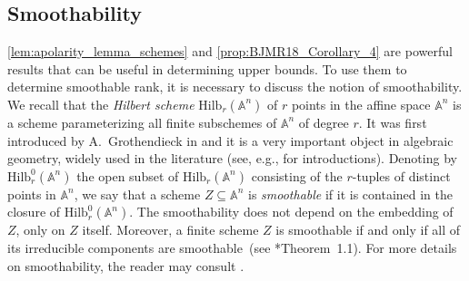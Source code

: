 \documentclass[a4paper,11pt,reqno]{amsart}
\newcommand{\bbA}{\mathbb{A}}
\newcommand{\bbK}{\mathbb{K}}
\newcommand{\Hilb}{\mathrm{Hilb}}
\numberwithin{equation}{section}
\theoremstyle{definition}
\theoremstyle{plain}
\theoremstyle{remark}
\begin{document}
\subsection{Smoothability}\label{sec:smoothability}
\noindent \autoref{lem:apolarity_lemma_schemes} and \autoref{prop:BJMR18_Corollary_4}
are powerful results that can be useful in determining upper bounds. To use them to determine smoothable rank, it is necessary to discuss the notion of smoothability.
We recall that the \textit{Hilbert scheme} $\Hilb_r(\bbA^n)$ of $r$ points in the
affine space $\bbA^n$ is a scheme {parameterizing} all finite
subschemes of $\bbA^n$ of degree $r$. It was first introduced by
A.~Grothendieck in \cite{Gro61} and it is a very important object in algebraic geometry, widely used in the literature (see, e.g., \cites{Str96, MS05, Ber12}
for introductions).
Denoting by $\Hilb_r^0(\bbA^n)$ the open subset of  $\Hilb_r(\bbA^n)$ consisting of the $r$-tuples of distinct points in $\bbA^n$, we say that a scheme $Z\subseteq\bbA^n$ is \textit{smoothable} if it is contained in the closure of $\Hilb_r^0(\bbA^n)$.
The smoothability does not depend on the embedding of $Z$, only on $Z$ itself.
Moreover, a finite scheme $Z$ is smoothable if and only if all of its irreducible
components are smoothable~(see \cite{BJ17}*{Theorem~1.1}).
For more details on smoothability, the reader may consult \cites{IK99, BJ17, CEVV09,JKK19}.

\newcommand{\powerseries}{\bbK[\![t]\!]}
\end{document}
